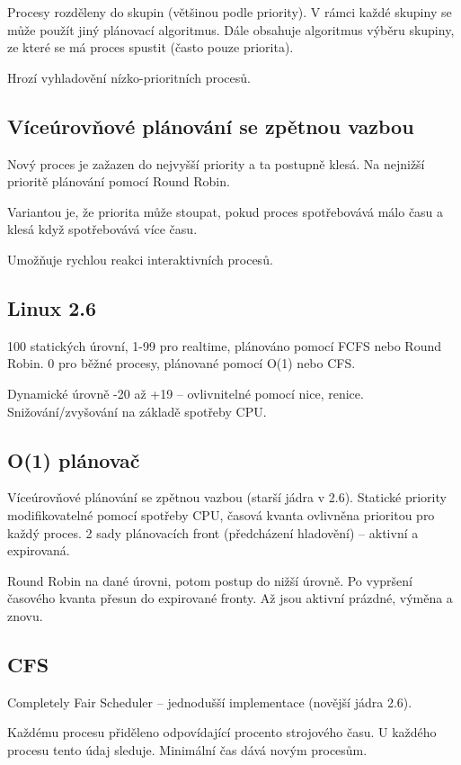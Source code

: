 \documentclass[a4wide]{report}
\begin{document}
Procesy rozděleny do skupin (většinou podle priority). V rámci každé skupiny se může použít jiný plánovací algoritmus. Dále obsahuje algoritmus výběru skupiny, ze které se má proces spustit (často pouze priorita).

Hrozí vyhladovění nízko-prioritních procesů.

\subsection{Víceúrovňové plánování se zpětnou vazbou}

Nový proces je zažazen do nejvyšší priority a ta postupně klesá. Na nejnižší prioritě plánování pomocí Round Robin.

Variantou je, že priorita může stoupat, pokud proces spotřebovává málo času a klesá když spotřebovává více času.

Umožňuje rychlou reakci interaktivních procesů.

\subsection{Linux 2.6}

100 statických úrovní, 1-99 pro realtime, plánováno pomocí FCFS nebo Round Robin. 0 pro běžné procesy, plánované pomocí O(1) nebo CFS.

Dynamické úrovně -20 až +19 -- ovlivnitelné pomocí nice, renice. Snižování/zvyšování na základě spotřeby CPU.

\subsection{O(1) plánovač}
Víceúrovňové plánování se zpětnou vazbou (starší jádra v 2.6). Statické priority modifikovatelné pomocí spotřeby CPU, časová kvanta ovlivněna prioritou pro každý proces. 2 sady plánovacích front (předcházení hladovění) -- aktivní a expirovaná.

Round Robin na dané úrovni, potom postup do nižší úrovně. Po vypršení časového kvanta přesun do expirované fronty. Až jsou aktivní prázdné, výměna a znovu.

\subsection{CFS}

Completely Fair Scheduler -- jednodušší implementace (novější jádra 2.6).

Každému procesu přiděleno odpovídající procento strojového času. U každého procesu tento údaj sleduje. Minimální čas dává novým procesům.
\end{document}
